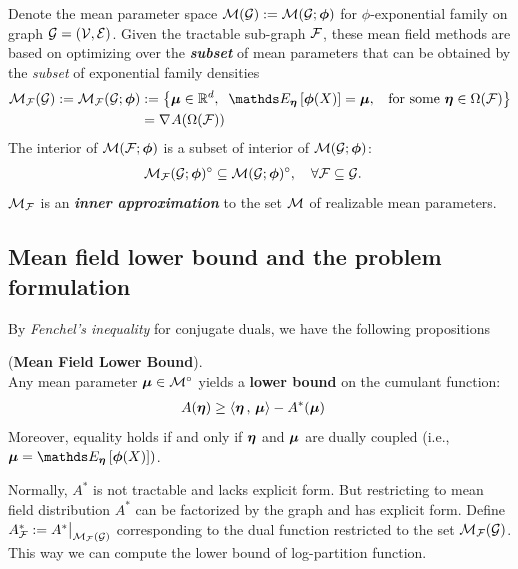 \documentclass[11pt]{article}
\begin{document}
Denote the mean parameter space ${\mathcal M}({\mathcal G}) := {\mathcal M}({\mathcal G}; \boldsymbol{\phi})$ for $\phi$-exponential family on graph ${\mathcal G} = ({\mathcal V}, {\mathcal E})$. Given the tractable sub-graph ${\mathcal F}$, these mean field
methods are based on optimizing over the \emph{\textbf{subset}} of mean parameters that can be obtained by the \emph{subset} of exponential family densities
\begin{align}
\cM_{\cF}(\cG):=\cM_{\cF}(\cG; \mb{\phi}) &:= \set{\mb{\mu} \in \bR^{d}, \;\; \E{\mb{\eta}}{\mb{\phi}(X)} =  \mb{\mu}, \;\; \text{ for some }\mb{\eta} \in \Omega(\cF)} \label{eqn: mean_field_parameter_space} \\
&= \grad{}{A}(\Omega(\cF)) \label{eqn: mean_field_parameter_space2} 
\end{align} The interior of ${\mathcal M}({\mathcal F}; \boldsymbol{\phi})$ is a subset of interior of ${\mathcal M}({\mathcal G}; \boldsymbol{\phi})$:
\begin{align*}
{\mathcal M}_{{\mathcal F}}({\mathcal G}; \boldsymbol{\phi})^{\circ}  &\subseteq  {\mathcal M}({\mathcal G}; \boldsymbol{\phi})^{\circ}, \quad \forall {\mathcal F} \subseteq {\mathcal G}.
\end{align*} ${\mathcal M}_{{\mathcal F}}$ is an \emph{\textbf{inner approximation}} to the set ${\mathcal M}$ of realizable mean parameters. 


\subsection{Mean field lower bound and the problem formulation}
By \emph{Fenchel’s inequality} for conjugate duals, we have the following propositions
\begin{proposition} (\textbf{Mean Field Lower Bound}). \\
Any mean parameter $\boldsymbol{\mu} \in {\mathcal M}^{\circ}$ yields a \textbf{lower bound} on the cumulant function:
\begin{align}
A(\boldsymbol{\eta}) &\ge \left\langle \boldsymbol{\eta}\,,\, \boldsymbol{\mu} \right\rangle - A^{*}(\boldsymbol{\mu}) \label{eqn: mean_field_lower_bound}
\end{align}
Moreover, equality holds if and only if $\boldsymbol{\eta}$ and $\boldsymbol{\mu}$ are dually coupled (i.e., $\mb{\mu} = \E{\mb{\eta}}{\mb{\phi}(X)})$.
\end{proposition}

Normally, $A^{*}$ is not tractable and lacks explicit form. But restricting to mean field distribution $A^{*}$ can be factorized by the graph and has explicit form. Define $A_{{\mathcal F}}^{*} := A^{*}\big|_{{\mathcal M}_{{\mathcal F}}({\mathcal G})}$ corresponding to the dual function restricted to the set ${\mathcal M}_{{\mathcal F}}({\mathcal G})$. This way we can compute the lower bound of log-partition function.
\end{document}

